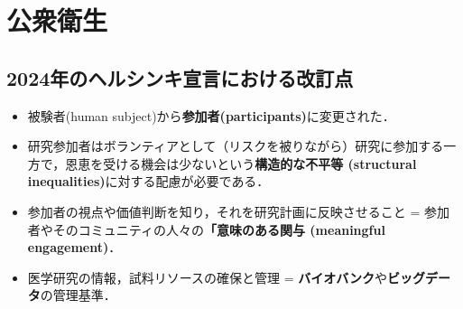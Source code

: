 \section{公衆衛生}
\subsection{2024年のヘルシンキ宣言における改訂点}
\begin{itemize}

\item 被験者(human subject)から\textbf{参加者(participants)}に変更された．
\item 研究参加者はボランティアとして（リスクを被りながら）研究に参加する一方で，恩恵を受ける機会は少ないという\textbf{構造的な不平等 (structural inequalities)}に対する配慮が必要である．
\item 参加者の視点や価値判断を知り，それを研究計画に反映させること = 参加者やそのコミュニティの人々の\textbf{「意味のある関与 (meaningful engagement)}．
\item 医学研究の情報，試料リソースの確保と管理 = \textbf{バイオバンク}や\textbf{ビッグデータ}の管理基準．

\end{itemize}


